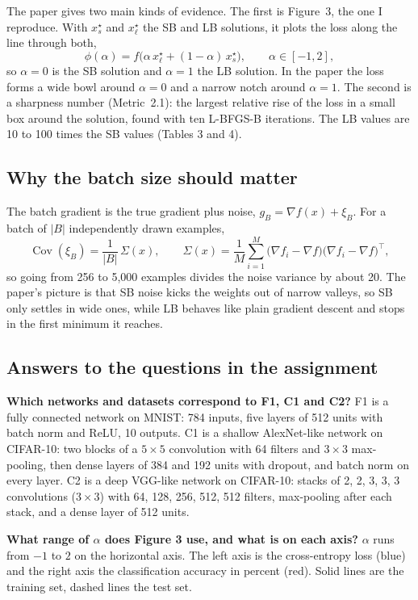 The paper gives two main kinds of evidence. The first is Figure~3, the one I reproduce. With $x_s^\star$ and $x_\ell^\star$ the SB and LB solutions, it plots the loss along the line through both,
\[
  \phi(\alpha)=f\big(\alpha\,x_\ell^\star+(1-\alpha)\,x_s^\star\big),\qquad \alpha\in[-1,2],
\]
so $\alpha=0$ is the SB solution and $\alpha=1$ the LB solution. In the paper the loss forms a wide bowl around $\alpha=0$ and a narrow notch around $\alpha=1$. The second is a sharpness number (Metric~2.1): the largest relative rise of the loss in a small box around the solution, found with ten L-BFGS-B iterations. The LB values are 10 to 100 times the SB values (Tables 3 and 4).

\subsection{Why the batch size should matter}
The batch gradient is the true gradient plus noise, $g_B=\nabla f(x)+\xi_B$. For a batch of $|B|$ independently drawn examples,
\[
  \operatorname{Cov}(\xi_B)=\frac{1}{|B|}\,\Sigma(x),\qquad \Sigma(x)=\frac1M\sum_{i=1}^M\big(\nabla f_i-\nabla f\big)\big(\nabla f_i-\nabla f\big)^{\!\top},
\]
so going from 256 to 5{,}000 examples divides the noise variance by about 20. The paper's picture is that SB noise kicks the weights out of narrow valleys, so SB only settles in wide ones, while LB behaves like plain gradient descent and stops in the first minimum it reaches.

\subsection{Answers to the questions in the assignment}
\textbf{Which networks and datasets correspond to F1, C1 and C2?} F1 is a fully connected network on MNIST: 784 inputs, five layers of 512 units with batch norm and ReLU, 10 outputs. C1 is a shallow AlexNet-like network on CIFAR-10: two blocks of a $5\times5$ convolution with 64 filters and $3\times3$ max-pooling, then dense layers of 384 and 192 units with dropout, and batch norm on every layer. C2 is a deep VGG-like network on CIFAR-10: stacks of 2, 2, 3, 3, 3 convolutions ($3\times3$) with 64, 128, 256, 512, 512 filters, max-pooling after each stack, and a dense layer of 512 units.

\textbf{What range of $\alpha$ does Figure 3 use, and what is on each axis?} $\alpha$ runs from $-1$ to $2$ on the horizontal axis. The left axis is the cross-entropy loss (blue) and the right axis the classification accuracy in percent (red). Solid lines are the training set, dashed lines the test set.

